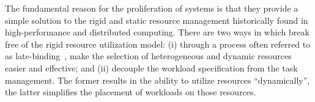 \documentclass{sig-alternate}
\begin{document}




The fundamental reason for the proliferation of \pilotjob systems is that they
provide a simple solution to the rigid and static resource management
historically found in high-performance and distributed computing.  There are two
ways in which \pilotjobs break free of the rigid resource utilization model: (i)
through a process often referred to as
late-binding~\cite{moscicki2011,glatard2010,delgado2014}, \pilotjobs make the
selection of heterogeneous and dynamic resources easier and effective; and (ii)
\pilotjobs decouple the workload specification from the task management.  The
former results in the ability to utilize resources ``dynamically'', the latter
simplifies the placement of workloads on those resources.


\end{document}
